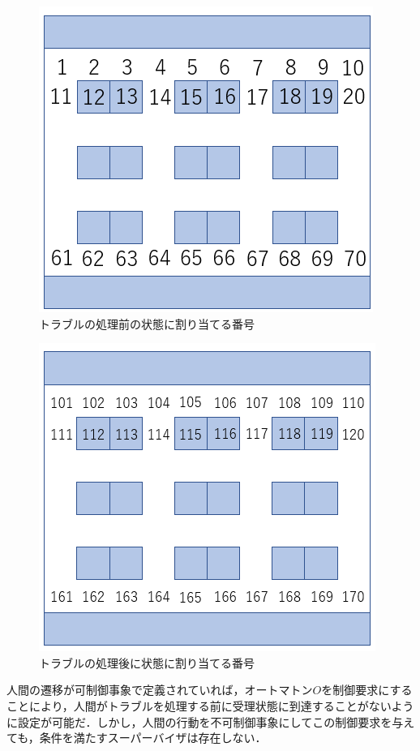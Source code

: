 \begin{figure}[!t]
    \centering
    \includegraphics[scale=0.5]{figures/Warehouse_before.png}
    \caption{トラブルの処理前の状態に割り当てる番号}
    \label{fig:Warehouse_before}
\end{figure}
\begin{figure}[!t]
    \centering
    \includegraphics[scale=0.5]{figures/Warehouse_after.png}
    \caption{トラブルの処理後に状態に割り当てる番号}
    \label{fig:Warehouse_after}
\end{figure}

人間の遷移が可制御事象で定義されていれば，オートマトン$O$を制御要求にすることにより，人間がトラブルを処理する前に受理状態に到達することがないように設定が可能だ．しかし，人間の行動を不可制御事象にしてこの制御要求を与えても，条件を満たすスーパーバイザは存在しない．


